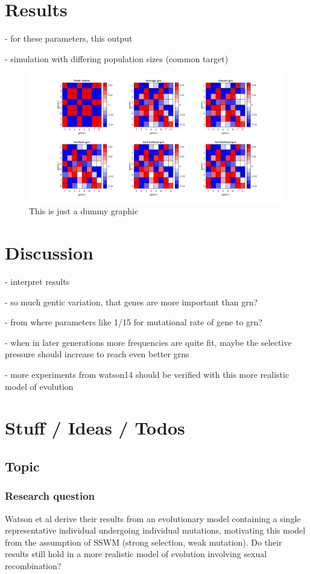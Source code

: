 \documentclass{article}
\begin{document}
\section{Results}

- for these parameters, this output

- simulation with differing population sizes (common target)

\begin{figure}[H]
	\includegraphics[width=\linewidth]{./img/dummy.jpg}
	\caption{This is just a dummy graphic}
	\label{fig:dummy}
\end{figure}


\section{Discussion}

- interpret results

- so much gentic variation, that genes are more important than grn?

- from where parameters like 1/15 for mutational rate of gene to grn?

- when in later generations more frequencies are quite fit, maybe the selective pressure should increase to reach even better grns

- more experiments from watson14 should be verified with this more realistic model of evolution


\section{Stuff / Ideas / Todos}

\subsection{Topic}
\subsubsection{Research question}
Watson et al derive their results from an evolutionary model containing a single representative individual undergoing individual mutations, motivating this model from the assumption of SSWM (strong selection, weak mutation). Do their results still hold in a more realistic model of evolution involving sexual recombination?
\end{document}
